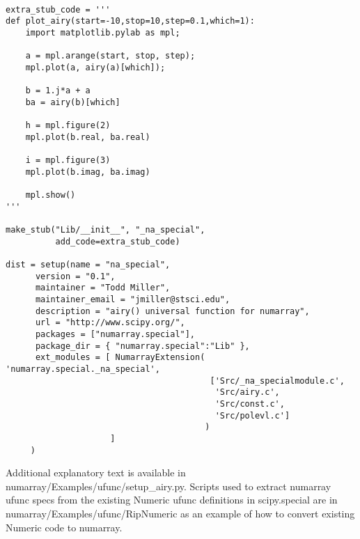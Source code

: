 \begin{verbatim}

extra_stub_code = '''
def plot_airy(start=-10,stop=10,step=0.1,which=1):
    import matplotlib.pylab as mpl;

    a = mpl.arange(start, stop, step);
    mpl.plot(a, airy(a)[which]);

    b = 1.j*a + a
    ba = airy(b)[which]

    h = mpl.figure(2)
    mpl.plot(b.real, ba.real)

    i = mpl.figure(3)
    mpl.plot(b.imag, ba.imag)
    
    mpl.show()
'''

make_stub("Lib/__init__", "_na_special", 
          add_code=extra_stub_code)

dist = setup(name = "na_special",
      version = "0.1",
      maintainer = "Todd Miller",
      maintainer_email = "jmiller@stsci.edu",
      description = "airy() universal function for numarray",
      url = "http://www.scipy.org/",
      packages = ["numarray.special"],
      package_dir = { "numarray.special":"Lib" },
      ext_modules = [ NumarrayExtension( 'numarray.special._na_special',
                                         ['Src/_na_specialmodule.c',
                                          'Src/airy.c',
                                          'Src/const.c',
                                          'Src/polevl.c']
                                        )
                     ]
     )

\end{verbatim}

Additional explanatory text is available in
numarray/Examples/ufunc/setup_airy.py.  Scripts used to extract
numarray ufunc specs from the existing Numeric ufunc definitions
in scipy.special are in numarray/Examples/ufunc/RipNumeric as an
example of how to convert existing Numeric code to numarray.



